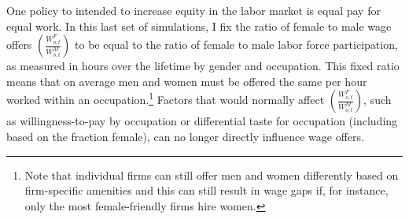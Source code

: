 \documentclass[12pt]{article}
\begin{document}




One policy to intended to increase equity in the labor market is equal pay for equal work. In this last set of simulations, I fix the ratio of female to male wage offers $\left( \frac{W^F_{o,t}}{W^M_{o,t}} \right) $ to be equal to the ratio of female to male labor force participation, as measured in hours over the lifetime by gender and occupation. This fixed ratio means that on average men and women must be offered the same per hour worked within an occupation.\footnote{Note that individual firms can still offer men and women differently based on firm-specific amenities and this can still result in wage gaps if, for instance, only the most female-friendly firms hire women.} Factors that would normally affect $\left( \frac{W^F_{o,t}}{W^M_{o,t}} \right) $, such as willingness-to-pay by occupation or differential taste for occupation (including based on the fraction female), can no longer directly influence wage offers.
\end{document}
